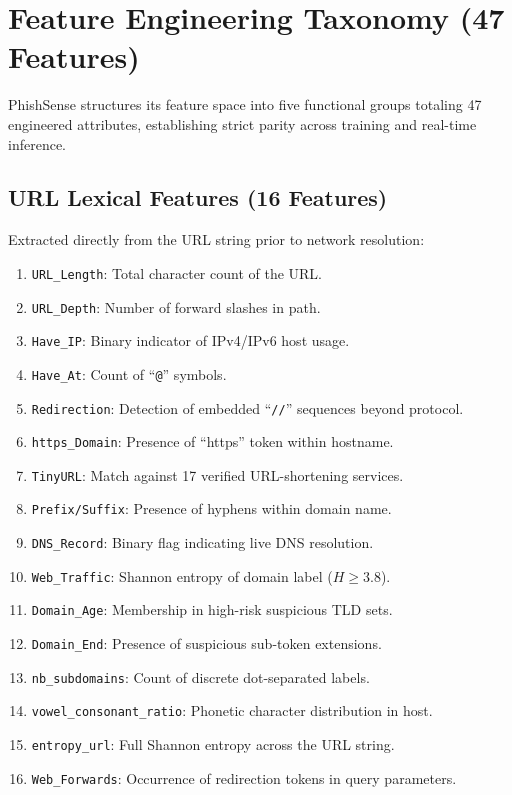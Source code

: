 \documentclass[conference]{IEEEtran}
\begin{document}
\section{Feature Engineering Taxonomy (47 Features)}

PhishSense structures its feature space into five functional groups totaling 47 engineered
attributes, establishing strict parity across training and real-time inference.

\subsection{URL Lexical Features (16 Features)}
Extracted directly from the URL string prior to network resolution:
\begin{enumerate}[leftmargin=*,nosep]
\item \texttt{URL\_Length}: Total character count of the URL.
\item \texttt{URL\_Depth}: Number of forward slashes in path.
\item \texttt{Have\_IP}: Binary indicator of IPv4/IPv6 host usage.
\item \texttt{Have\_At}: Count of ``\texttt{@}'' symbols.
\item \texttt{Redirection}: Detection of embedded ``\texttt{//}'' sequences beyond protocol.
\item \texttt{https\_Domain}: Presence of ``https'' token within hostname.
\item \texttt{TinyURL}: Match against 17 verified URL-shortening services.
\item \texttt{Prefix/Suffix}: Presence of hyphens within domain name.
\item \texttt{DNS\_Record}: Binary flag indicating live DNS resolution.
\item \texttt{Web\_Traffic}: Shannon entropy of domain label ($H \ge 3.8$).
\item \texttt{Domain\_Age}: Membership in high-risk suspicious TLD sets.
\item \texttt{Domain\_End}: Presence of suspicious sub-token extensions.
\item \texttt{nb\_subdomains}: Count of discrete dot-separated labels.
\item \texttt{vowel\_consonant\_ratio}: Phonetic character distribution in host.
\item \texttt{entropy\_url}: Full Shannon entropy across the URL string.
\item \texttt{Web\_Forwards}: Occurrence of redirection tokens in query parameters.
\end{enumerate}
\end{document}
